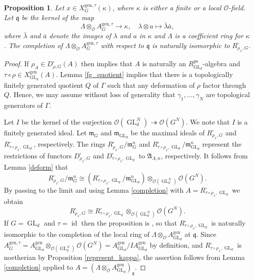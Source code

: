 \documentclass{amsart}
\newtheorem{prop}{Proposition}[section]
\theoremstyle{definition}
\theoremstyle{remark}
\DeclareMathOperator{\GL}{GL}
\DeclareMathOperator{\id}{id}
\newcommand{\mm}{\mathfrak m}
\newcommand{\OO}{\mathcal O}
\newcommand{\qq}{\mathfrak{q}}
\newcommand{\ps}{\mathrm{ps}}
\newcommand{\gen}{\mathrm{gen}}
\begin{document}
\begin{prop}\label{333} 
Let $x\in X^{\gen, \tau}_G(\kappa)$, where  $\kappa$ is either a finite or a local $\OO$-field.
 Let 
$\qq$ be the kernel of the 
map $$\Lambda\otimes_{\OO} A^{\gen,\tau}_G \rightarrow \kappa, \quad \lambda \otimes a \mapsto \bar{\lambda}\bar{a},$$
where $\bar{\lambda}$ and $\bar{a}$ denote the images
of $\lambda$ and $a$ in $\kappa$ and $\Lambda$ is a coefficient ring for $\kappa$. 
The completion of $\Lambda\otimes_{\OO} A^{\gen,\tau}_G$ with respect to $\qq$ is naturally isomorphic to $R^{\square}_{\rho_x,G}$.
\end{prop}
\begin{proof} If $\rho_A\in D^{\square}_{\rho, G}(A)$ then \cite[Proposition 3.33]{BIP_new} implies that $A$ is naturally an 
$R^{\ps}_{\GL_d}$-algebra and $\tau\circ \rho\in X^{\gen}_{\GL_d}(A)$.
Lemma \ref{fg_quotient} implies that there is a topologically finitely generated quotient $Q$ of $\Gamma$ such that any deformation of $\rho$ factor through $Q$.  Hence, we may 
assume without loss of generality that $\gamma_1, \ldots, \gamma_N$ are topological generators of $\Gamma$.

Let $I$ be the kernel of the surjection  $\OO(\GL_d^N)\twoheadrightarrow \OO(G^N)$. We note that $I$ is a 
finitely generated ideal. Let $\mm_G$ and $\mm_{\GL_d}$ be the maximal ideals of $R^{\square}_{\rho_x,G}$ and $R^{\square}_{\tau\circ \rho_x, \GL_d}$,  respectively. The rings $R^{\square}_{\rho_x,G}/\mm_G^n$ and 
$R^{\square}_{\tau\circ \rho_x, \GL_d}/\mm_{\GL_d}^n$ represent 
the restrictions of functors $D^{\square}_{\rho_x, G}$ and $D^{\square}_{\tau\circ \rho_x, \GL_d}$ to $\mathfrak A_{\Lambda, n}$, 
respectively. It follows from Lemma \ref{deform} that 
$$ R^{\square}_{\rho_x,G}/\mm_G^n\cong (R^{\square}_{\tau\circ \rho_x, \GL_d}/\mm_{\GL_d}^n) \otimes_{\OO(\GL_d^N)} \OO(G^N).$$
By passing to the limit and using Lemma \ref{completion} with $A=R^{\square}_{\tau\circ \rho_x, \GL_d}$  we obtain 
$$R^{\square}_{\rho_x, G}\cong 
R^{\square}_{\tau\circ\rho_x, \GL_d}\otimes_{\OO(\GL_d^N)} \OO(G^N).$$
If $G=\GL_d$ and $\tau=\id$ then the proposition is \cite[Proposition 3.33]{BIP_new}, so that $R^{\square}_{\tau\circ\rho_x, \GL_d}$ is naturally isomorphic to  the 
completion of the local ring of $\Lambda\otimes_{\OO} A^{\gen}_{\GL_d}$ at $\qq$. 
Since $A^{\gen,\tau}_G=A^{\gen}_{\GL_d} \otimes_{\OO(\GL_d^N)} \OO(G^N)= 
A^{\gen}_{\GL_d}/ I A^{\gen}_{\GL_d}$ by definition, and $R^{\square}_{\tau\circ\rho_x, \GL_d}$ is noetherian by Proposition \ref{represent_kappa}, the assertion follows from Lemma \ref{completion} applied 
to $A=(\Lambda\otimes_{\OO} A^{\gen}_{\GL_d})_{\qq}$. 
\end{proof}
\end{document}
